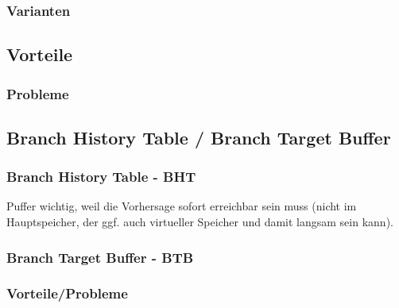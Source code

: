 \subsubsection{Varianten}
\subsection{Vorteile}
\subsubsection{Probleme}


\subsection{Branch History Table / Branch Target Buffer}
\subsubsection{Branch History Table - BHT}
Puffer wichtig, weil die Vorhersage sofort erreichbar sein muss (nicht im Hauptspeicher, der ggf. auch virtueller Speicher und damit langsam sein kann).
\subsubsection{Branch Target Buffer - BTB}
\subsubsection*{Vorteile/Probleme}

